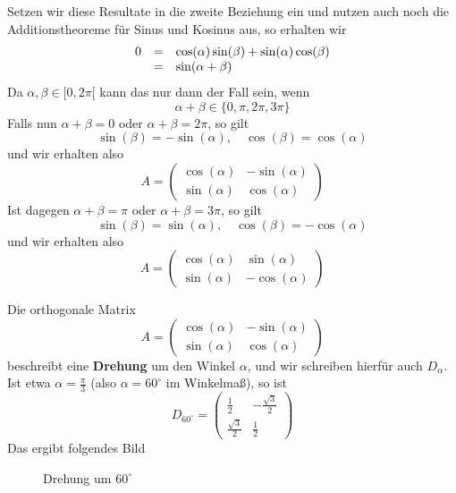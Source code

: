 \begin{beispiel}
Setzen wir diese Resultate in die zweite Beziehung ein und nutzen auch noch die Additionstheoreme für Sinus 
und Kosinus aus, so erhalten wir
  	$$ \begin{array} {l c l}
  	0 & = & \cos(\alpha) \sin(\beta) + \sin(\alpha) \cos(\beta) \\
  	& = & \sin(\alpha + \beta) 
  	\end{array} $$
Da $\alpha, \beta \in [0, 2\pi[$ kann das nur dann der Fall sein, wenn 
  	$$ \alpha + \beta \in \{0, \pi, 2 \pi, 3 \pi \} $$
Falls nun $\alpha + \beta = 0$ oder $\alpha + \beta = 2\pi$, so gilt
  	$$ \sin(\beta) = - \sin(\alpha), \quad \cos(\beta) = \cos(\alpha) $$
und wir erhalten also 
  	$$  A = \left( \begin{matrix} \cos(\alpha) & -\sin(\alpha) \\ \sin(\alpha) & \cos(\alpha) \end{matrix} \right) $$
Ist dagegen $\alpha + \beta = \pi$ oder $\alpha + \beta = 3 \pi$, so gilt
  	$$ \sin(\beta) = \sin(\alpha), \quad \cos(\beta) = -\cos(\alpha) $$
und wir erhalten also 
  	$$  A = \left( \begin{matrix} \cos(\alpha) & \sin(\alpha) \\ \sin(\alpha) & -\cos(\alpha) \end{matrix} \right) $$
 
Die orthogonale Matrix 
  	$$  A = \left( \begin{matrix} \cos(\alpha) & -\sin(\alpha) \\ \sin(\alpha) & \cos(\alpha) \end{matrix} \right) $$
beschreibt eine \textbf{Drehung} 
um den Winkel $\alpha$, und wir schreiben hierfür auch $D_{\alpha}$. Ist etwa 
$\alpha = \frac {\pi}{3}$ (also $\alpha = 60^{\circ}$ 
im Winkelmaß), so ist
  	$$ D_{60^{\circ}} =  \left( \begin{matrix} \frac {1}{2} & -\frac {\sqrt{3}}{2} \\ 
	\frac {\sqrt{3}}{2} & \frac {1}{2} \end{matrix} \right) $$
Das ergibt folgendes Bild


\begin{figure}[H]
	\vspace{-0.5cm}
	\begin{center}
	\begin{scaletikzpicturetowidth}{\hsize}
     		 
	\end{scaletikzpicturetowidth}
	\vspace{-0.5cm}
	\caption{Drehung um $60^{\circ}$}\label{lin:05_det_3100}
	\end{center}
	\vspace{-0.5cm}
\end{figure}


\end{beispiel}
